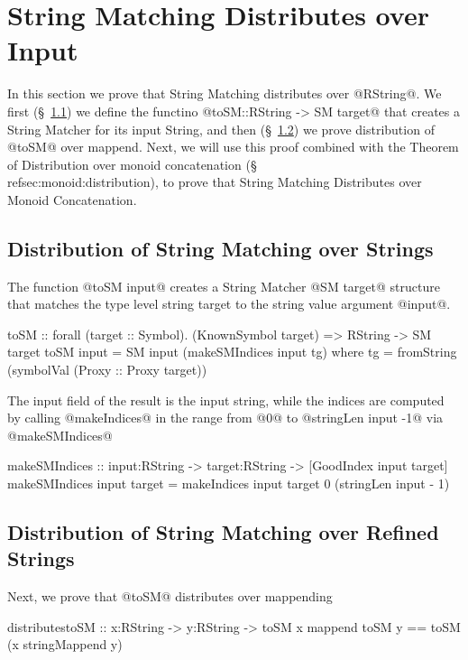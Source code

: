 \section{String Matching Distributes over Input}\label{sec:distribution}
%
In this section we prove that String Matching distributes over @RString@.
%
We first (\S~\ref{subsec:toSM}) we define the functino @toSM::RString -> SM target@
that creates a String Matcher for its input String, 
and then (\S~\ref{subsec:distribution:sm}) we prove distribution of @toSM@ over mappend. 
%
Next, we will use this proof combined with the Theorem of 
Distribution over monoid concatenation (\S~\\ref{sec:monoid:distribution}), 
to prove that String Matching Distributes over Monoid Concatenation.

\subsection{Distribution of String Matching over Strings}\label{subsec:toSM}

The function @toSM input@  creates a String Matcher @SM target@
structure that matches the type level string target to the 
string value argument @input@.
\begin{code}
toSM :: forall (target :: Symbol). (KnownSymbol target) 
     => RString -> SM target 
toSM input = SM input (makeSMIndices input tg) 
  where
    tg = fromString (symbolVal (Proxy :: Proxy target))
\end{code}
%
The input field of the result is the input string, 
while the indices are computed by calling @makeIndices@ 
in the range from @0@ to @stringLen input -1@
via @makeSMIndices@
%
\begin{code}
makeSMIndices 
  :: input:RString -> target:RString 
  -> [GoodIndex input target]
makeSMIndices input target 
  = makeIndices input target 0 (stringLen input - 1)
\end{code}

\subsection{Distribution of String Matching over Refined Strings}\label{subsec:distribution:sm}

Next, we prove that @toSM@ distributes over mappending
\begin{theorem}\label{theorem:distribution:toSM}
\begin{code}
distributestoSM :: x:RString -> y:RString 
  -> { toSM x mappend toSM y == toSM (x stringMappend y)}
\end{code}
\end{theorem}

